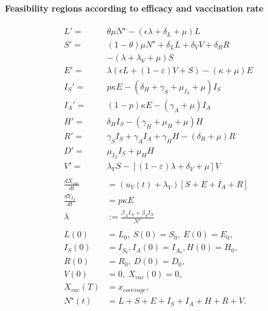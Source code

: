 \paragraph{Feasibility regions according to efficacy and vaccination rate}
%
\begin{equation}
    \label{eqn:vacination_dynamics}
    \begin{aligned}
        L' =&  \theta \mu N^{\star}
                -(\epsilon \lambda + \delta_L + \mu) L 
        \\
        S' =&
        	(1 - \theta) \mu N^\star
            + \delta_L L
            + \delta_V V
            + \delta_R R
        	\\
            &-
            \left(
            	\lambda + \lambda_V + \mu
            \right) S
        \\
        E' =&
                \lambda (\epsilon L + (1-\varepsilon) V + S)
                - (\kappa + \mu) E
        \\
        I_S' =&
        	p \kappa E
            - 
            (	
            	\delta_H +
            	\gamma_S +
                \mu_{I_S} +
                \mu
            ) I_S
        \\
        I_A' = &
                (1 - p) \kappa E - (\gamma_A + \mu) I_A
        \\
        H' = &
        		\delta_H I_S - (\gamma_H + \mu_H + \mu) H
        \\
        R' = &
            	\gamma_S I_S +
                \gamma_A I_A +
                \gamma_H H 
                - (\delta_R + \mu) R
        \\
        D'  = &
                \mu_{I_S} I_S + \mu_H H
        \\
        V' = &
            \lambda_V  S
            - \left[
            	(1 - \varepsilon) \lambda
                + \delta_V
                + \mu
            \right ] V
        \\
        \\
            \frac{dX_{vac}}{dt}
            	&=
            	(u_V(t) + \lambda_V)
            	\left[
            		S + E + I_A + R
            	\right]
        \\
            \frac{d Y_{I_S}}{dt}
            	& = p \kappa E
        \\
            \lambda &:=
                \frac{\beta_A I_A + \beta_S I_S}{N^{\star}}
        \\
        \\
            L(0) &= L_0, 
            \ S(0) = S_0, 
            \ E(0) = E_0, 
        \\
            I_S(0) &= I_{S_{0}},
            I_A(0) = I_{A_{0}},
            H(0) = H_0, 
        \\
            R(0) &= R_0, \ D(0) = D_0,
      \\
            V(0) &= 0, \ X_{vac}(0) = 0, \quad
      \\
            X_{vac}(T) &= x_{coverage},
      \\
            N^{\star}(t) &=
                L + S +E + I_S + I_A +
                H + R + V .
        \end{aligned}
\end{equation}

